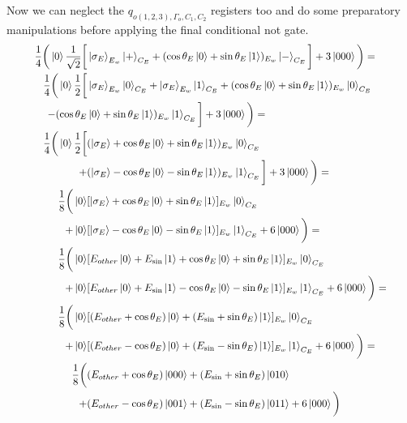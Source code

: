 \newpage
\noindent
Now we can neglect the $q_{o(1,2,3),\Gamma_o,C_1,C_2}$ registers too and do some preparatory manipulations before applying the final conditional not gate. 
\begin{equation}
   \resizebox{.9\hsize}{!}{$\begin{split}
        \frac{1}{4}\bigg(\ket{0}\frac{1}{\sqrt{2}}\bigg[&\ket{\sigma_E}_{E_w}\ket{+}_{C_E}+(\cos\theta_E\ket{0}+\sin\theta_E\ket{1})_{E_w}\ket{-}_{C_E}\bigg]+3\ket{000}\bigg)=\\
        \frac{1}{4}\bigg(\ket{0}\frac{1}{2}\bigg[&\ket{\sigma_E}_{E_w}\ket{0}_{C_E}+\ket{\sigma_E}_{E_w}\ket{1}_{C_E}+(\cos\theta_E\ket{0}+\sin\theta_E\ket{1})_{E_w}\ket{0}_{C_E}\\
        -(\cos\theta_E&\ket{0}+\sin\theta_E\ket{1})_{E_w}\ket{1}_{C_E}\bigg]+3\ket{000}\bigg)=\\
        \frac{1}{4}\bigg(
        \ket{0}\frac{1}{2}\bigg[&
        (\ket{\sigma_E}+\cos\theta_E\ket{0}+\sin\theta_E\ket{1})_{E_w}\ket{0}_{C_E}\\
        +&(\ket{\sigma_E}-\cos\theta_E\ket{0}-\sin\theta_E\ket{1})_{E_w}\ket{1}_{C_E}
        \bigg]+3\ket{000}\bigg)=\\
        \frac{1}{8}\bigg(
        \ket{0}&
        [\ket{\sigma_E}+\cos\theta_E\ket{0}+\sin\theta_E\ket{1}]_{E_w}\ket{0}_{C_E}\\
        +\ket{0}&[\ket{\sigma_E}-\cos\theta_E\ket{0}-\sin\theta_E\ket{1}]_{E_w}\ket{1}_{C_E}
        +6\ket{000}\bigg)=\\
        \frac{1}{8}\bigg(
         \ket{0}&[E_{other}\ket{0}+E_{\sin}\ket{1}+\cos\theta_E\ket{0}+\sin\theta_E\ket{1}]_{E_w}\ket{0}_{C_E}\\
        +\ket{0}&[E_{other}\ket{0}+E_{\sin}\ket{1}-\cos\theta_E\ket{0}-\sin\theta_E\ket{1}]_{E_w}\ket{1}_{C_E}
        +6\ket{000}\bigg)=\\
        \frac{1}{8}\bigg(
        \ket{0}&[(E_{other}+\cos\theta_E)\ket{0}+(E_{\sin}+\sin\theta_E)\ket{1}]_{E_w}\ket{0}_{C_E}\\
        +\ket{0}&[(E_{other}-\cos\theta_E)\ket{0}+(E_{\sin}-\sin\theta_E)\ket{1}]_{E_w}\ket{1}_{C_E}
        +6\ket{000}\bigg)=\\
        \frac{1}{8}\bigg(
        &(E_{other}+\cos\theta_E)\ket{000}+(E_{\sin}+\sin\theta_E)\ket{010}\\+
        &(E_{other}-\cos\theta_E)\ket{001}+(E_{\sin}-\sin\theta_E)\ket{011}+6\ket{000}\bigg)\\
   \end{split}$}
\end{equation}

